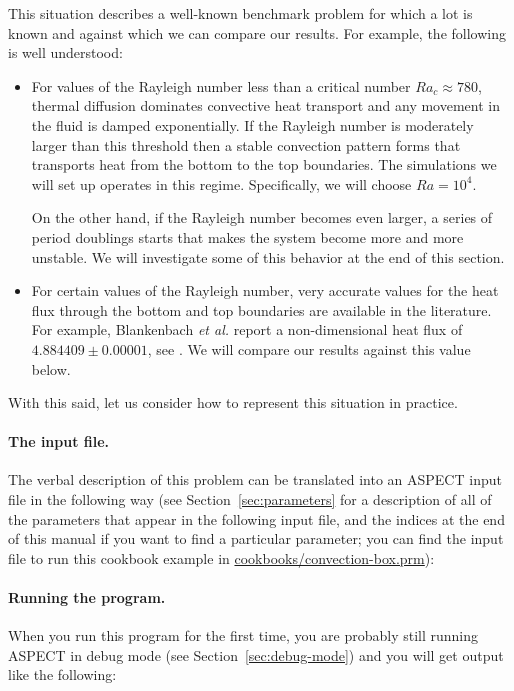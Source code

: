 \documentclass{article}
\newcommand{\aspect}{\textsc{ASPECT}}
\begin{document}
This situation describes a well-known benchmark problem for which a lot is
known and against which we can compare our results. For example, the following
is well understood:
\begin{itemize}
  \item For values of the Rayleigh number less than a critical number
  $Ra_c\approx 780$, thermal diffusion dominates convective heat transport and
  any movement in the fluid is damped exponentially. If the Rayleigh number is moderately larger
  than this threshold then a stable convection pattern forms that transports
  heat from the bottom to the top boundaries. The simulations we will set up
  operates in this regime. Specifically, we will choose $Ra=10^4$.

  On the other hand, if the Rayleigh number becomes even larger, a series of
  period doublings starts that makes the system become more and more unstable.
  We will investigate some of this behavior at the end of this section.

  \item For certain values of the Rayleigh number, very accurate values for the
  heat flux through the bottom and top boundaries are available in the literature.
  For example, Blankenbach \textit{et al.} report a non-dimensional heat flux of
  $4.884409 \pm 0.00001$, see \cite{BBC89}. We will compare our results against
  this value below.
\end{itemize}

With this said, let us consider how to represent this situation in practice.


\paragraph{The input file.}
The verbal description of this problem can be translated into an \aspect{}
input file in the following way (see Section~\ref{sec:parameters} for a
description of all of the parameters that appear in the following input file,
and the indices at the end of this manual if you want to find a particular
parameter; you can find the input file to run this cookbook example in
\url{cookbooks/convection-box.prm}):




\paragraph{Running the program.}
When you run this program for the first time, you are probably still running
\aspect{} in debug mode (see Section~\ref{sec:debug-mode}) and you will get
output like the following:
\end{document}
